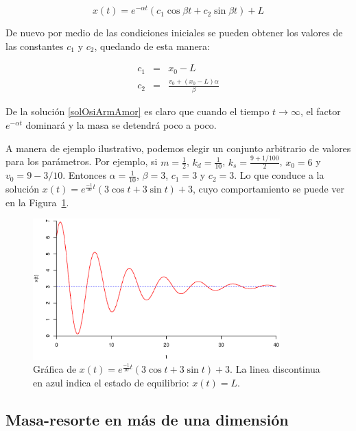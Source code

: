 \begin{equation}
\label{solOsiArmAmor} 
x(t) = e^{-\alpha t} \left( c_1 \cos{\beta t} + c_2 \sin{\beta t} \right) + L
\end{equation}

De nuevo por medio de las condiciones iniciales se pueden obtener los valores de las constantes $c_1$ y $c_2$, quedando de esta manera:

\begin{eqnarray}
c_1 & = & x_0 - L \nonumber \\
c_2 & = & \frac{v_0 + \left( x_0 - L \right) \alpha }{\beta } \nonumber 
\end{eqnarray}

De la solución \eqref{solOsiArmAmor} es claro que cuando el tiempo $t \rightarrow \infty $, el factor $e^{-\alpha t}$ dominará y la masa se detendrá poco a poco.

A manera de ejemplo ilustrativo, podemos elegir un conjunto arbitrario de valores para los parámetros. 
Por ejemplo, si $m = \frac{1}{2}$, $k_d = \frac{1}{10}$, $k_s = \frac{9 + 1 / 100}{2}$, $x_0 = 6$ y $v_0 = 9 - 3/10$.
Entonces $\alpha = \frac{1}{10}$, $\beta = 3$, $c_1 = 3$ y $c_2 = 3$.
Lo que conduce a la solución $x(t) = e^{\frac{-1}{10}t} \left( 3 \cos{t} + 3 \sin{t} \right) + 3$, cuyo comportamiento se puede ver en la Figura~\ref{OsciAmor:fig}.

\begin{figure}[htb]
 \centering
 \includegraphics[width=0.85\textwidth]{Img/01/oscilador_amortiguado}
 \caption[Plano fase del oscilador armónico amortiguado]{ 
 Gráfica de $x(t) = e^{\frac{-1}{10}t} \left( 3 \cos{t} + 3 \sin{t} \right) + 3$. La linea discontinua en azul indica el estado de equilibrio: $x(t) = L$.
 } \label{OsciAmor:fig}
\end{figure}

\subsection{Masa-resorte en más de una dimensión}

